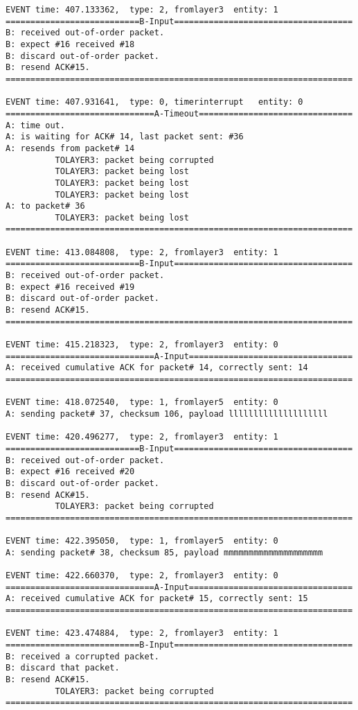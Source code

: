 \documentclass[12pt]{article}
\begin{document}
\begin{verbatim}
EVENT time: 407.133362,  type: 2, fromlayer3  entity: 1
===========================B-Input====================================
B: received out-of-order packet.
B: expect #16 received #18
B: discard out-of-order packet.
B: resend ACK#15.
======================================================================

EVENT time: 407.931641,  type: 0, timerinterrupt   entity: 0
==============================A-Timeout===============================
A: time out. 
A: is waiting for ACK# 14, last packet sent: #36
A: resends from packet# 14 
          TOLAYER3: packet being corrupted
          TOLAYER3: packet being lost
          TOLAYER3: packet being lost
          TOLAYER3: packet being lost
A: to packet# 36
          TOLAYER3: packet being lost
======================================================================

EVENT time: 413.084808,  type: 2, fromlayer3  entity: 1
===========================B-Input====================================
B: received out-of-order packet.
B: expect #16 received #19
B: discard out-of-order packet.
B: resend ACK#15.
======================================================================

EVENT time: 415.218323,  type: 2, fromlayer3  entity: 0
==============================A-Input=================================
A: received cumulative ACK for packet# 14, correctly sent: 14
======================================================================

EVENT time: 418.072540,  type: 1, fromlayer5  entity: 0
A: sending packet# 37, checksum 106, payload llllllllllllllllllll

EVENT time: 420.496277,  type: 2, fromlayer3  entity: 1
===========================B-Input====================================
B: received out-of-order packet.
B: expect #16 received #20
B: discard out-of-order packet.
B: resend ACK#15.
          TOLAYER3: packet being corrupted
======================================================================

EVENT time: 422.395050,  type: 1, fromlayer5  entity: 0
A: sending packet# 38, checksum 85, payload mmmmmmmmmmmmmmmmmmmm

EVENT time: 422.660370,  type: 2, fromlayer3  entity: 0
==============================A-Input=================================
A: received cumulative ACK for packet# 15, correctly sent: 15
======================================================================

EVENT time: 423.474884,  type: 2, fromlayer3  entity: 1
===========================B-Input====================================
B: received a corrupted packet.
B: discard that packet.
B: resend ACK#15.
          TOLAYER3: packet being corrupted
======================================================================


\end{verbatim}
\end{document}
